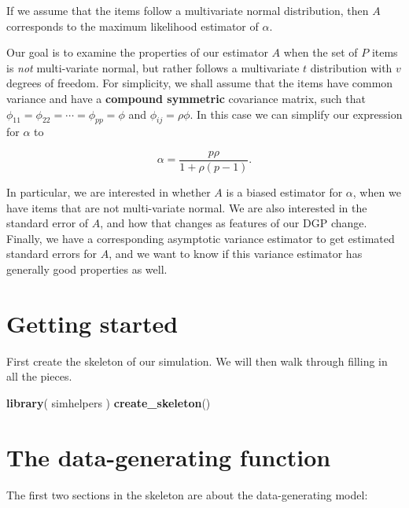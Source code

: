 \documentclass[
]{book}
\newenvironment{Shaded}{\begin{snugshade}}{\end{snugshade}}
\newcommand{\FunctionTok}[1]{\textcolor[rgb]{0.13,0.29,0.53}{\textbf{#1}}}
\newcommand{\NormalTok}[1]{#1}
\begin{document}
If we assume that the items follow a multivariate normal distribution, then \(A\) corresponds to the maximum likelihood estimator of \(\alpha\).

Our goal is to examine the properties of our estimator \(A\) when the set of \(P\) items is \emph{not} multi-variate normal, but rather follows a multivariate \(t\) distribution with \(v\) degrees of freedom.
For simplicity, we shall assume that the items have common variance and have a \textbf{compound symmetric} covariance matrix, such that \(\phi_{11} = \phi_{22} = \cdots = \phi_{pp} = \phi\) and \(\phi_{ij} = \rho \phi\). In this case we can simplify our expression for \(\alpha\) to

\[
\alpha = \frac{p \rho}{1 + \rho (p - 1)}.
\]

In particular, we are interested in whether \(A\) is a biased estimator for \(\alpha\), when we have items that are not multi-variate normal.
We are also interested in the standard error of \(A\), and how that changes as features of our DGP change.
Finally, we have a corresponding asymptotic variance estimator to get estimated standard errors for \(A\), and we want to know if this variance estimator has generally good properties as well.

\section{Getting started}\label{getting-started}

First create the skeleton of our simulation.
We will then walk through filling in all the pieces.

\begin{Shaded}
\begin{Highlighting}[]
\FunctionTok{library}\NormalTok{( simhelpers )}
\FunctionTok{create\_skeleton}\NormalTok{()}
\end{Highlighting}
\end{Shaded}

\section{The data-generating function}\label{the-data-generating-function}

The first two sections in the skeleton are about the data-generating model:
\end{document}
